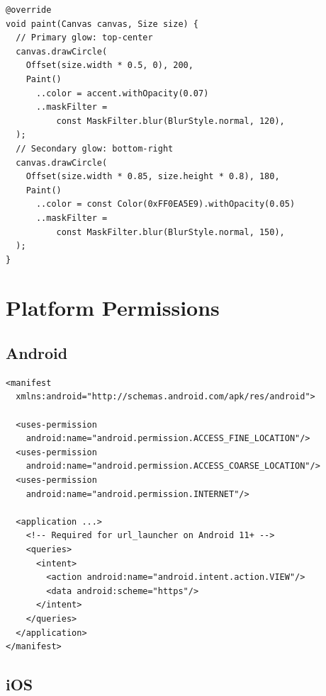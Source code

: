 \documentclass[12pt, a4paper]{report}
\begin{document}
\begin{tcolorbox}[cyanbox, title=CustomPainter with MaskFilter blur]
\begin{lstlisting}[style=dartcode]
@override
void paint(Canvas canvas, Size size) {
  // Primary glow: top-center
  canvas.drawCircle(
    Offset(size.width * 0.5, 0), 200,
    Paint()
      ..color = accent.withOpacity(0.07)
      ..maskFilter =
          const MaskFilter.blur(BlurStyle.normal, 120),
  );
  // Secondary glow: bottom-right
  canvas.drawCircle(
    Offset(size.width * 0.85, size.height * 0.8), 180,
    Paint()
      ..color = const Color(0xFF0EA5E9).withOpacity(0.05)
      ..maskFilter =
          const MaskFilter.blur(BlurStyle.normal, 150),
  );
}
\end{lstlisting}
\end{tcolorbox}

\chapter{Platform Permissions}

\section{Android}

\begin{tcolorbox}[cyanbox, title=AndroidManifest.xml]
\begin{lstlisting}[style=yamlcode, numbers=none]
<manifest
  xmlns:android="http://schemas.android.com/apk/res/android">

  <uses-permission
    android:name="android.permission.ACCESS_FINE_LOCATION"/>
  <uses-permission
    android:name="android.permission.ACCESS_COARSE_LOCATION"/>
  <uses-permission
    android:name="android.permission.INTERNET"/>

  <application ...>
    <!-- Required for url_launcher on Android 11+ -->
    <queries>
      <intent>
        <action android:name="android.intent.action.VIEW"/>
        <data android:scheme="https"/>
      </intent>
    </queries>
  </application>
</manifest>
\end{lstlisting}
\end{tcolorbox}

\section{iOS}
\end{document}
